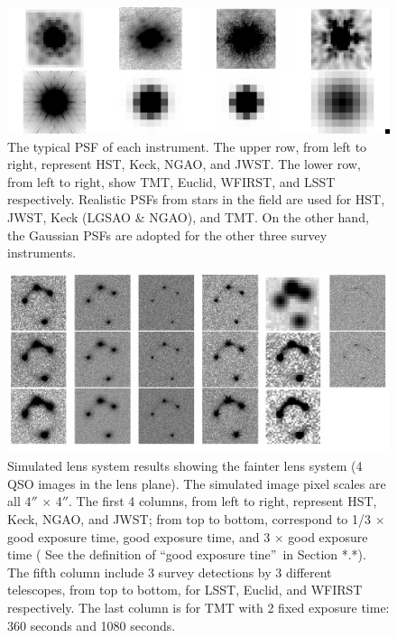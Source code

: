 \documentclass[a4paper,11pt]{article}
\begin{document}
\begin{figure}
\begin{center}
\includegraphics[width=1.0\textwidth]{figures/PSF_montage.png}
\end{center}
\caption{The typical PSF of each instrument. The upper row, from left to right, represent HST, Keck, NGAO, and JWST. The lower row, from left to right, show TMT, Euclid, WFIRST, and LSST respectively. Realistic PSFs from stars in the field are used for HST, JWST, Keck (LGSAO \& NGAO), and TMT. On the other hand, the Gaussian PSFs are adopted for the other three survey instruments.}
\label{fig:PSF_montage}
\end{figure}



\begin{figure}
\begin{center}
\includegraphics[width=1.0\textwidth]{figures/fainter_system_4QSOimages_all.png}
\end{center}
\caption{Simulated lens system results showing the fainter lens system (4 QSO images in the lens plane). The simulated image pixel scales are all 4$''$ $\times$ 4$''$. The first 4 columns, from left to right, represent HST, Keck, NGAO, and JWST; from top to bottom, correspond to 1/3 $\times$ good exposure time, good exposure time, and 3 $\times$ good exposure time ( See the definition of \textquotedblleft good exposure tine\textquotedblright\ in Section *.*). The fifth column include 3 survey detections by 3 different telescopes, from top to bottom, for LSST, Euclid, and WFIRST respectively. The last column is for TMT with 2 fixed exposure time: 360 seconds and 1080 seconds.}
\label{fig:fainter_4QSOimages_montage}
\end{figure}
\end{document}
